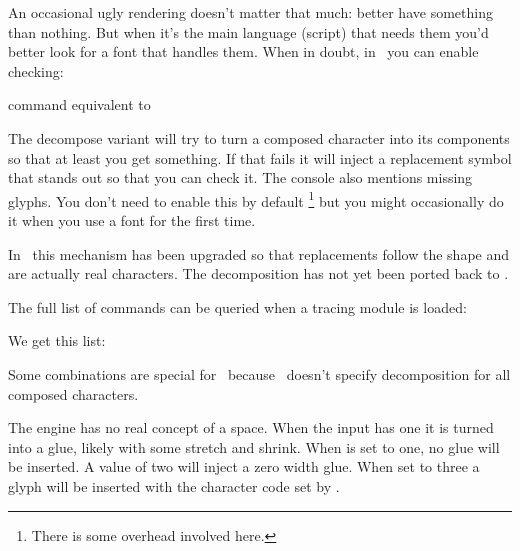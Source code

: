 An occasional ugly rendering doesn't matter that much: better have something than
nothing. But when it's the main language (script) that needs them you'd better
look for a font that handles them. When in doubt, in \CONTEXT\ you can enable
checking:

\starttabulate[|l|l|]
    \BC command                           \BC equivalent to \NC \NR
    \NC \type {\checkmissingcharacters}   \NC {} \NC \NR
    \NC \type {\removemissingcharacters}  \NC \type{\enabletrackers[fonts.missing=remove]} \NC \NR
    \NC \type {\replacemissingcharacters} \NC \type{\enabletrackers[fonts.missing=replace]} \NC \NR
    \NC \type {\handlemissingcharacters}  \NC \type{\enabletrackers[fonts.missing={decompose,replace}]} \NC \NR
\stoptabulate

The decompose variant will try to turn a composed character into its components
so that at least you get something. If that fails it will inject a replacement
symbol that stands out so that you can check it. The console also mentions
missing glyphs. You don't need to enable this by default \footnote {There is some
overhead involved here.} but you might occasionally do it when you use a font for
the first time.

In \LMTX\ this mechanism has been upgraded so that replacements follow the shape
and are actually real characters. The decomposition has not yet been ported back
to \MKIV.

The full list of commands can be queried when a tracing module is loaded:

\startbuffer
{}

\showcharactercombinations
\stopbuffer

\typebuffer

We get this list:

\getbuffer

Some combinations are special for \CONTEXT\ because \UNICODE\ doesn't specify
decomposition for all composed characters.

\stopsectionlevel

\startsectionlevel[title={spaces}]

The engine has no real concept of a space. When the input has one it is turned
into a glue, likely with some stretch and shrink. When \typ {\nospaces} is set to
one, no glue will be inserted. A value of two will inject a zero width glue. When
set to three a glyph will be inserted with the character code set by \typ
{\spacechar}.

